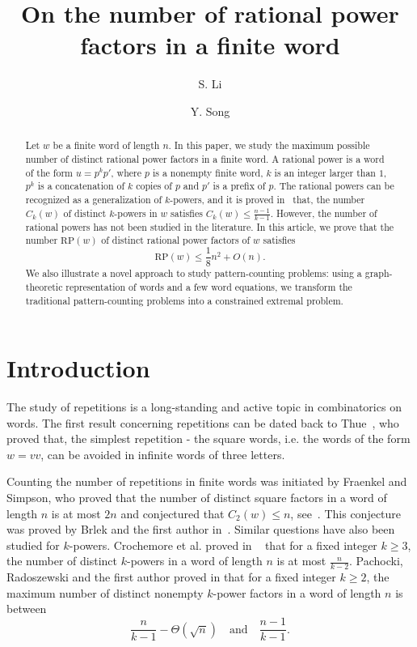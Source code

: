 \documentclass[runningheads,envcountsame,a4paper]{llncs}
\title{On the number of rational power factors in a finite word}
\author{S. Li\inst{1} \and Y. Song\inst{2}}
\institute{Hangzhou International Innovation Institute of Beihang University, \\Sino-French Laboratory for Mathematics\\
\email{shuoli@buaa.edu.cn}
\and
LMIB-School of Mathematical Sciences, Beihang University, Beijing\\
\email{yuan.song@buaa.edu.cn}
 }
\newcommand{\rp}{\mathrm{RP}}
\begin{document}
\maketitle


\begin{abstract}
Let $w$ be a finite word of length $n$. In this paper, we study the maximum possible number of distinct rational power factors in a finite word. A rational power is a word of the form $u=p^kp'$, where $p$ is a nonempty finite word, $k$ is an integer larger than $1$, $p^k$ is a concatenation of $k$ copies of $p$ and $p'$ is a prefix of $p$. The rational powers can be recognized as a generalization of $k$-powers, and it is proved in~\cite{kpower} that, the number $C_k(w)$ of distinct $k$-powers in $w$ satisfies $C_k(w) \leq \frac{n-1}{k-1}$. However, the number of rational powers has not been studied in the literature. In this article, we prove that the number $\rp(w)$ of distinct rational power factors of $w$ satisfies
\[
 \rp(w)\le
\frac18n^2+O(n).
\]
We also illustrate a novel approach to study pattern-counting problems: using a graph-theoretic representation of words and a few word equations, we transform the traditional pattern-counting problems into a constrained extremal problem.  
\end{abstract}

\section{Introduction}

 The study of repetitions is a long-standing and active topic in combinatorics on words. The first result concerning repetitions can be dated back to Thue~\cite{Thue1906}, who proved that, the simplest repetition - the square words, i.e. the words of the form $w=vv$, can be avoided in infinite words of three letters. 

Counting the number of repetitions in finite words was initiated by Fraenkel and Simpson, who proved that the number of distinct square factors in a word of length $n$ is at most $2n$ and conjectured that $C_2(w)\le n$, see~\cite{FraenkelS98}. This conjecture was proved by Brlek and the first author in~\cite{sq}.
Similar questions have also been studied for $k$-powers. Crochemore et al. proved in ~\cite{CMFS10} that for a fixed integer $k\ge 3$, the number of distinct $k$-powers in a word of length $n$ is at most $\frac{n}{k-2}$. Pachocki, Radoszewski and the first author proved in \cite{kpower} that for a fixed integer \(k\ge2\), the maximum number of distinct nonempty \(k\)-power factors in a word of length
\(n\) is between
\[
        \frac{n}{k-1}-\Theta(\sqrt n)
        \quad\text{and}\quad
        \frac{n-1}{k-1}.
\]
\end{document}
